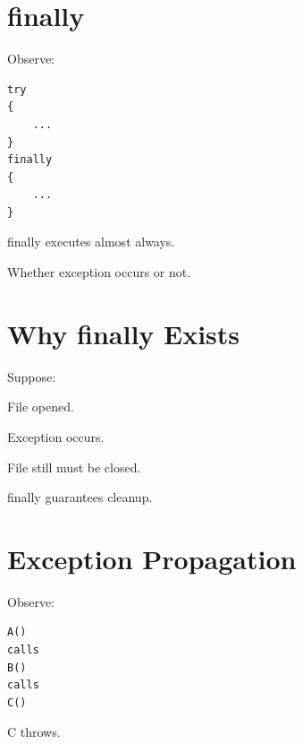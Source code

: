 \documentclass[11pt,a4paper]{book}
\begin{document}
\section{finally}

Observe:

\begin{verbatim} 
try
{
    ...
}
finally
{
    ...
}
\end{verbatim}


finally executes almost always.


Whether exception occurs or not.


\section{Why finally Exists}

Suppose:


File opened.


Exception occurs.


File still must be closed.


finally guarantees cleanup.


\section{Exception Propagation}

Observe:

\begin{verbatim} 
A()
calls
B()
calls
C()
\end{verbatim}


C throws.

\end{document}

